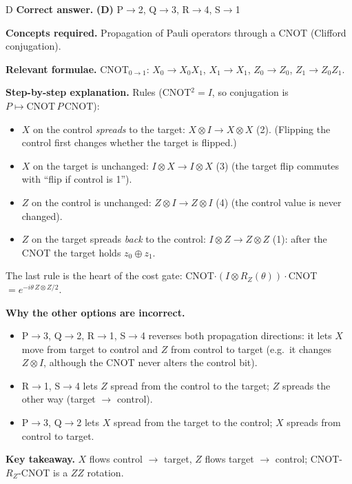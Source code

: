\documentclass[11pt,a4paper]{article}
\newcommand{\qsep}{\par\vspace{2pt}{\color{black!15}\hrule}\vspace{4pt}}
\begin{document}
\begin{solbox}{D}
\textbf{\color{brand}Correct answer.} \textcolor{okgreen}{\textbf{(D)}} P$\to$2, Q$\to$3, R$\to$4, S$\to$1

\textbf{\color{brand}Concepts required.} Propagation of Pauli operators through a CNOT (Clifford conjugation).

\textbf{\color{brand}Relevant formulae.} CNOT$_{0\to1}$: $X_0 \to X_0X_1$, $X_1 \to X_1$, $Z_0 \to Z_0$, $Z_1 \to Z_0Z_1$.

\textbf{\color{brand}Step-by-step explanation.} Rules (CNOT$^2 = I$, so conjugation is $P \mapsto \mathrm{CNOT}\,P\,\mathrm{CNOT}$):
\begin{itemize}\itemsep0pt
\item $X$ on the control \emph{spreads} to the target: $X\otimes I \to X\otimes X$ (2). (Flipping the control first changes whether the target is flipped.)
\item $X$ on the target is unchanged: $I\otimes X \to I\otimes X$ (3) (the target flip commutes with ``flip if control is 1'').
\item $Z$ on the control is unchanged: $Z\otimes I \to Z\otimes I$ (4) (the control value is never changed).
\item $Z$ on the target spreads \emph{back} to the control: $I\otimes Z \to Z\otimes Z$ (1): after the CNOT the target holds $z_0\oplus z_1$.
\end{itemize}
The last rule is the heart of the cost gate: CNOT$\cdot(I\otimes R_Z(\theta))\cdot$CNOT $= e^{-i\theta\,Z\otimes Z/2}$.

\textbf{\color{brand}Why the other options are incorrect.}
\begin{itemize}[leftmargin=2.4em, itemsep=1pt, topsep=2pt]
\item[\textbf{(A)}] P$\to$3, Q$\to$2, R$\to$1, S$\to$4 reverses both propagation directions: it lets $X$ move from target to control and $Z$ from control to target (e.g.\ it changes $Z\otimes I$, although the CNOT never alters the control bit).
\item[\textbf{(B)}] R$\to$1, S$\to$4 lets $Z$ spread from the control to the target; $Z$ spreads the other way (target $\to$ control).
\item[\textbf{(C)}] P$\to$3, Q$\to$2 lets $X$ spread from the target to the control; $X$ spreads from control to target.
\end{itemize}
\textbf{\color{brand}Key takeaway.} $X$ flows control $\to$ target, $Z$ flows target $\to$ control; CNOT-$R_Z$-CNOT is a $ZZ$ rotation.
\end{solbox}
\qsep
\end{document}
